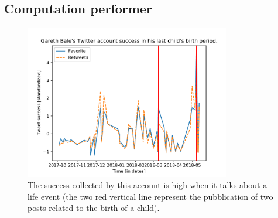 \subsection{Computation performer}
\label{sec:computationperformer}

\begin{figure}
\centering
\includegraphics[width=%
0.8\textwidth]{img/bale}
\caption{The success collected by this account is high when it talks about a life event (the two red vertical line represent the pubblication of two posts related to the birth of a child).}
\label{fig:bale}
\end{figure}

